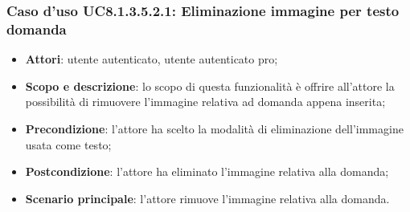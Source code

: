 \subsubsection{Caso d’uso UC8.1.3.5.2.1: Eliminazione immagine per testo domanda}
\begin{itemize}
	\item\textbf{Attori}: utente autenticato, utente autenticato pro;
	\item\textbf{Scopo e descrizione}: lo scopo di questa funzionalità è offrire all'attore  la possibilità di rimuovere l'immagine relativa ad domanda appena inserita;
	\item\textbf{Precondizione}: l'attore ha scelto la modalità di eliminazione dell'immagine usata come testo; 
	\item \textbf{Postcondizione}: l'attore ha eliminato l'immagine relativa alla domanda;
	\item\textbf{Scenario principale}: l'attore rimuove l'immagine relativa alla domanda. 
\end{itemize}

